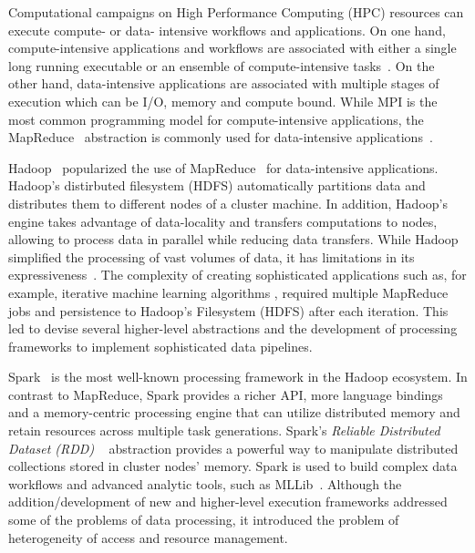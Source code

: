 \label{ch:pilot-data-hadoop}

Computational campaigns on High Performance Computing (HPC) resources can
execute compute- or data- intensive workflows and applications. On one hand,
compute-intensive applications and workflows are associated with either a single
long running executable or an ensemble of compute-intensive
tasks~\cite{balasubramanian2018harnessing}. On the other hand, data-intensive
applications are associated with multiple stages of execution which can be I/O,
memory and compute bound. While MPI is the most common programming model for
compute-intensive applications, the MapReduce~\cite{dean2004mapreduce}
abstraction is commonly used for data-intensive
applications~\cite{hellerstein2012science}.


Hadoop~\cite{hadoop} popularized the use of MapReduce~\cite{dean2004mapreduce}
for data-intensive applications. Hadoop's distirbuted filesystem (HDFS)
automatically partitions data and distributes them to different nodes of a
cluster machine. In addition, Hadoop's engine takes advantage of data-locality
and transfers computations to nodes, allowing to process data in parallel while
reducing data transfers. While Hadoop simplified the processing of vast volumes
of data, it has limitations in its
expressiveness~\cite{yelick2011magellan,isard2007dryad}. The complexity of
creating sophisticated applications such as, for example, iterative machine
learning algorithms , required multiple MapReduce
jobs and persistence to Hadoop's Filesystem (HDFS) after each iteration. This
led to devise several higher-level abstractions and the development of
processing frameworks to implement sophisticated data pipelines.

Spark~\cite{zaharia2010spark} is the most well-known processing framework in the
Hadoop ecosystem. In contrast to MapReduce, Spark provides a richer API, more
language bindings and a memory-centric processing engine that can utilize
distributed memory and retain resources across multiple task generations.
Spark's \emph{Reliable Distributed Dataset (RDD)} ~\cite{zaharia2012resilient}
abstraction provides a powerful way to manipulate distributed collections stored
in cluster nodes' memory. Spark is used to build complex data workflows and
advanced analytic tools, such as MLLib~\cite{mllib}. Although the
addition/development of new and higher-level execution frameworks addressed some
of the problems of data processing, it introduced the problem of heterogeneity
of access and resource management.

